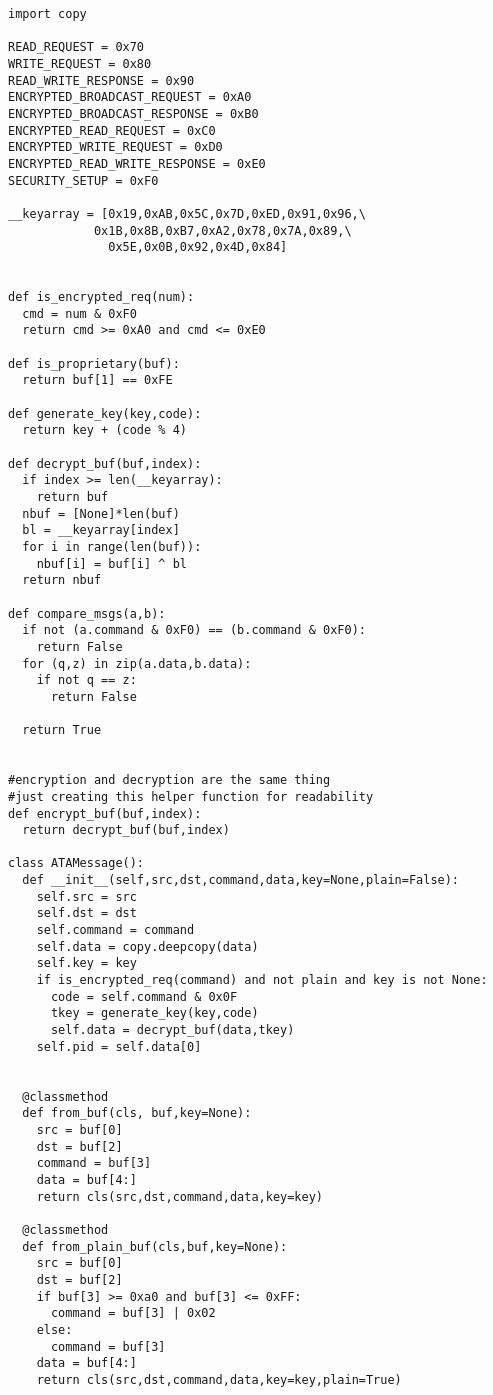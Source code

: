 \begin{verbatim}
import copy

READ_REQUEST = 0x70
WRITE_REQUEST = 0x80
READ_WRITE_RESPONSE = 0x90
ENCRYPTED_BROADCAST_REQUEST = 0xA0
ENCRYPTED_BROADCAST_RESPONSE = 0xB0
ENCRYPTED_READ_REQUEST = 0xC0
ENCRYPTED_WRITE_REQUEST = 0xD0
ENCRYPTED_READ_WRITE_RESPONSE = 0xE0
SECURITY_SETUP = 0xF0

__keyarray = [0x19,0xAB,0x5C,0x7D,0xED,0x91,0x96,\
            0x1B,0x8B,0xB7,0xA2,0x78,0x7A,0x89,\
              0x5E,0x0B,0x92,0x4D,0x84]


def is_encrypted_req(num):
  cmd = num & 0xF0
  return cmd >= 0xA0 and cmd <= 0xE0

def is_proprietary(buf):
  return buf[1] == 0xFE

def generate_key(key,code):
  return key + (code % 4)

def decrypt_buf(buf,index):
  if index >= len(__keyarray):
    return buf
  nbuf = [None]*len(buf)
  bl = __keyarray[index]
  for i in range(len(buf)):
    nbuf[i] = buf[i] ^ bl
  return nbuf

def compare_msgs(a,b):
  if not (a.command & 0xF0) == (b.command & 0xF0):
    return False
  for (q,z) in zip(a.data,b.data):
    if not q == z:
      return False

  return True


#encryption and decryption are the same thing
#just creating this helper function for readability
def encrypt_buf(buf,index):
  return decrypt_buf(buf,index)

class ATAMessage():
  def __init__(self,src,dst,command,data,key=None,plain=False):
    self.src = src
    self.dst = dst
    self.command = command
    self.data = copy.deepcopy(data)
    self.key = key
    if is_encrypted_req(command) and not plain and key is not None:
      code = self.command & 0x0F
      tkey = generate_key(key,code)
      self.data = decrypt_buf(data,tkey)
    self.pid = self.data[0]


  @classmethod
  def from_buf(cls, buf,key=None):
    src = buf[0]
    dst = buf[2]
    command = buf[3]
    data = buf[4:]
    return cls(src,dst,command,data,key=key)

  @classmethod
  def from_plain_buf(cls,buf,key=None):
    src = buf[0]
    dst = buf[2]
    if buf[3] >= 0xa0 and buf[3] <= 0xFF:
      command = buf[3] | 0x02
    else:
      command = buf[3]
    data = buf[4:]
    return cls(src,dst,command,data,key=key,plain=True)


\end{verbatim}
